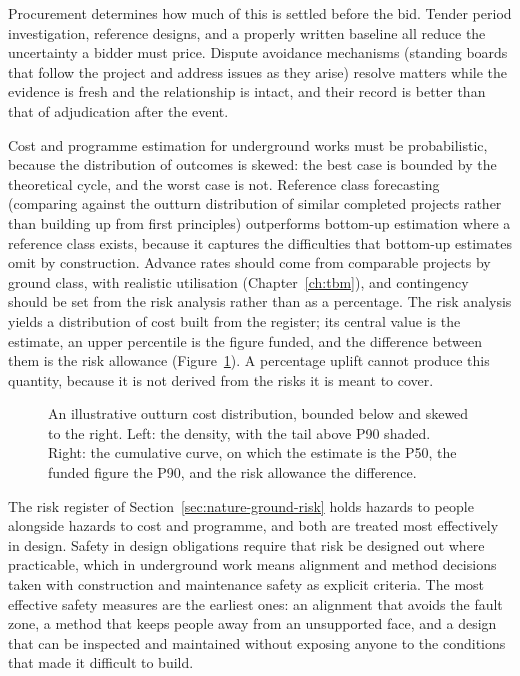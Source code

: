 Procurement determines how much of this is settled before the bid. Tender
period investigation, reference designs, and a properly written baseline all
reduce the uncertainty a bidder must price. Dispute avoidance mechanisms
(standing boards that follow the project and address issues as they arise)
resolve matters while the evidence is fresh and the relationship is intact, and
their record is better than that of adjudication after the event.

Cost and programme estimation for underground works must be probabilistic,
because the distribution of outcomes is skewed: the best case is bounded by
the theoretical cycle, and the worst case is not. Reference class forecasting
(comparing against the outturn distribution of similar completed projects
rather than building up from first principles) outperforms bottom-up
estimation where a reference class exists, because it captures the
difficulties that bottom-up estimates omit by construction. Advance rates should come from
comparable projects by ground class, with realistic utilisation
(Chapter~\ref{ch:tbm}), and contingency should be set from the risk analysis
rather than as a percentage. The risk analysis yields a distribution of cost
built from the register; its central value is the estimate, an upper
percentile is the figure funded, and the difference between them is the risk
allowance (Figure~\ref{fig:cost-distribution}). A percentage uplift cannot produce this quantity, because it is not
derived from the risks it is meant to cover.

\begin{figure}[htbp]
\centering
{}
\caption{An illustrative outturn cost distribution, bounded below and skewed to the right. Left: the density, with the tail above P90 shaded. Right: the cumulative curve, on which the estimate is the P50, the funded figure the P90, and the risk allowance the difference.}
\label{fig:cost-distribution}
\end{figure}

The risk register of Section~\ref{sec:nature-ground-risk} holds hazards to
people alongside hazards to cost and programme, and both are treated most
effectively in design. Safety in design
obligations require that risk be designed out where practicable, which in
underground work means alignment and method decisions taken with construction and
maintenance safety as explicit criteria. The most effective safety measures
are the earliest ones: an alignment that avoids the fault zone, a method that
keeps people away from an unsupported face, and a design that can be inspected
and maintained without exposing anyone to the conditions that made it
difficult to build.

